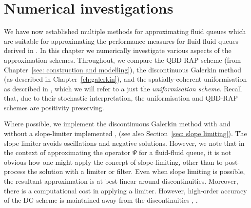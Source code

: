 \chapter{Numerical investigations\label{sec: numerics}}
We have now established multiple methods for approximating fluid queues which are suitable for approximating the performance measures for fluid-fluid queues derived in \cite{bo2014}. In this chapter we numerically investigate various aspects of the approximation schemes. Throughout, we compare the QBD-RAP scheme (from Chapter~\ref{sec: construction and modelling}), the discontinuous Galerkin method (as described in Chapter~\ref{ch:galerkin}), and the spatially-coherent uniformisation as described in \cite{bo2013}, which we will refer to a just the \emph{uniformisation scheme}. %
Recall that, due to their stochastic interpretation, the uniformisation and QBD-RAP schemes are positivity preserving. 

Where possible, we implement the discontinuous Galerkin method with and without a slope-limiter implemented \citep{c99}, \citep[Section~5.6.2]{nodalDGBook} (see also Section~\ref{sec: slope limiting}). The slope limiter avoids oscillations and negative solutions. However, we note that in the context of approximating the operator \(\mathbb\Psi\) for a fluid-fluid queue, it is not obvious how one might apply the concept of slope-limiting, other than to post-process the solution with a limiter or filter. Even when slope limiting is possible, the resultant approximation is at best linear around discontinuities. Moreover, there is a computational cost in applying a limiter. However, high-order accuracy of the DG scheme is maintained away from the discontinuities \citep{c99}, \citep[Section~5.6.2]{nodalDGBook}. 

